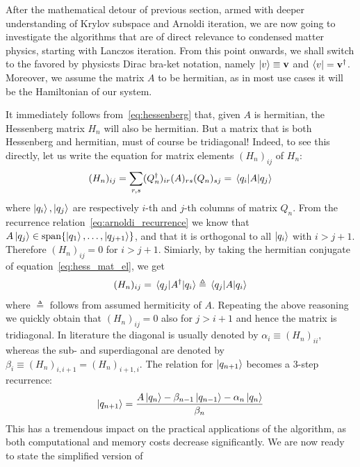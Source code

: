 After the mathematical detour of previous section, armed with deeper understanding of Krylov subspace and
Arnoldi iteration, we are now going to investigate the algorithms that are of direct relevance to condensed
matter physics, starting with Lanczos iteration. From this point onwards, we shall switch to the favored by physicsts
Dirac bra-ket notation, namely \(\ket{v} \equiv \vectorbold{v}\) and \(\bra{v} = \vectorbold{v}^{\dagger}\).
Moreover, we assume the matrix \(A\) to be hermitian,
as in most use cases it will be the Hamiltonian of our system. 

It immediately follows from~\eqref{eq:hessenberg} that, given \(A\) is hermitian, the Hessenberg matrix 
\(H_n\) will also be hermitian. But a matrix that is both Hessenberg and hermitian, must of course be tridiagonal!
Indeed, to see this directly, let us write the equation for matrix elements \((H_n)_{ij}\) of \(H_n\):
\begin{equation}
	(H_n)_{ij} = \sum_{r,s}(Q_n^{\dagger})_{ir}(A)_{rs}(Q_n)_{sj} = \matrixel{q_i}{A}{q_j}
	\label{eq:hess_mat_el}
\end{equation}
where \(\ket{q_i},\ket{q_j}\) are respectively \(i\)-th and \(j\)-th columns of matrix \(Q_n\). From 
the recurrence relation~\eqref{eq:arnoldi_recurrence} we know that 
\(A\ket{q_j} \in \mathrm{span}\{\ket{q_1},\ldots,\ket{q_{j+1}}\}\), and that it is orthogonal to all
\(\ket{q_i}\) with \(i > j+1\). Therefore \((H_n)_{ij} = 0\) for \(i>j+1\). Simiarly, by taking the hermitian conjugate
of equation~\eqref{eq:hess_mat_el}, we get
\begin{equation}
	(H_n)_{ij} = \matrixel{q_j}{A^{\dagger}}{q_i} \triangleq  \matrixel{q_j}{A}{q_i}	
\end{equation}
where \(\triangleq\) follows from assumed hermiticity of \(A\). Repeating the above reasoning we
quickly obtain that \((H_n)_{ij} = 0\) also for \(j > i+1\) and hence the matrix is tridiagonal.
In literature the diagonal is usually denoted by \(\alpha_i \equiv (H_n)_{ii}\), whereas the sub- and superdiagonal
are denoted by \(\beta_i \equiv (H_n)_{i,i+1} = (H_n)_{i+1,i}\). The relation for \(\ket{q_{n+1}}\) becomes
a \(3\)-step recurrence:
\begin{equation}
	\ket{q_{n+1}} = \frac{A \ket{q_n} - \beta_{n-1}\ket{q_{n-1}} - \alpha_n \ket{q_n}}{\beta_n}
	\label{eq:lanczos_recurrence}
\end{equation}
This has a tremendous impact on the practical applications of the algorithm, as both
computational and memory costs decrease significantly. We are now ready to state the simplified version of
